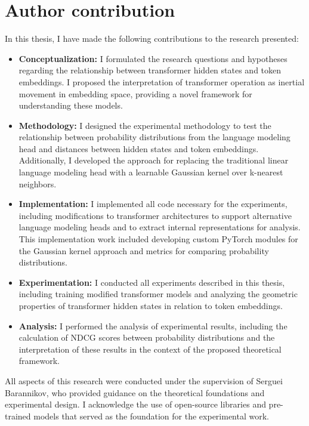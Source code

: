 \chapter{Author contribution}

In this thesis, I have made the following contributions to the research presented:

\begin{itemize}
    \item \textbf{Conceptualization:} I formulated the research questions and hypotheses regarding the relationship between transformer hidden states and token embeddings. I proposed the interpretation of transformer operation as inertial movement in embedding space, providing a novel framework for understanding these models.
    
    \item \textbf{Methodology:} I designed the experimental methodology to test the relationship between probability distributions from the language modeling head and distances between hidden states and token embeddings. Additionally, I developed the approach for replacing the traditional linear language modeling head with a learnable Gaussian kernel over k-nearest neighbors.
    
    \item \textbf{Implementation:} I implemented all code necessary for the experiments, including modifications to transformer architectures to support alternative language modeling heads and to extract internal representations for analysis. This implementation work included developing custom PyTorch modules for the Gaussian kernel approach and metrics for comparing probability distributions.
    
    \item \textbf{Experimentation:} I conducted all experiments described in this thesis, including training modified transformer models and analyzing the geometric properties of transformer hidden states in relation to token embeddings.
    
    \item \textbf{Analysis:} I performed the analysis of experimental results, including the calculation of NDCG scores between probability distributions and the interpretation of these results in the context of the proposed theoretical framework.
\end{itemize}

All aspects of this research were conducted under the supervision of Serguei Barannikov, who provided guidance on the theoretical foundations and experimental design. I acknowledge the use of open-source libraries and pre-trained models that served as the foundation for the experimental work.
